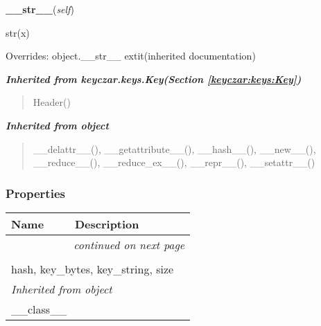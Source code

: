     \vspace{0.5ex}

\hspace{.8\funcindent}\begin{boxedminipage}{\funcwidth}

    \raggedright \textbf{\_\_str\_\_}(\textit{self})

\setlength{\parskip}{2ex}
    str(x)

\setlength{\parskip}{1ex}
      Overrides: object.\_\_str\_\_ 	extit{(inherited documentation)}

    \end{boxedminipage}


\large{\textbf{\textit{Inherited from keyczar.keys.Key\textit{(Section \ref{keyczar:keys:Key})}}}}

\begin{quote}
Header()
\end{quote}

\large{\textbf{\textit{Inherited from object}}}

\begin{quote}
\_\_delattr\_\_(), \_\_getattribute\_\_(), \_\_hash\_\_(), \_\_new\_\_(), \_\_reduce\_\_(), \_\_reduce\_ex\_\_(), \_\_repr\_\_(), \_\_setattr\_\_()
\end{quote}


  \subsubsection{Properties}

    \vspace{-1cm}
\hspace{\varindent}\begin{longtable}{|p{\varnamewidth}|p{\vardescrwidth}|l}
\cline{1-2}
\cline{1-2} \centering \textbf{Name} & \centering \textbf{Description}& \\
\cline{1-2}
\endhead\cline{1-2}\multicolumn{3}{r}{\small\textit{continued on next page}}\\\endfoot\cline{1-2}
\endlastfoot\multicolumn{2}{|l|}{\textit{Inherited from keyczar.keys.Key \textit{(Section \ref{keyczar:keys:Key})}}}\\
\multicolumn{2}{|p{\varwidth}|}{\raggedright hash, key\_bytes, key\_string, size}\\
\cline{1-2}
\multicolumn{2}{|l|}{\textit{Inherited from object}}\\
\multicolumn{2}{|p{\varwidth}|}{\raggedright \_\_class\_\_}\\
\cline{1-2}
\end{longtable}

